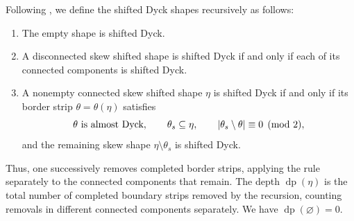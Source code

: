 \documentclass[12pt]{amsart}
\newcommand{\defi}[1]{{\upshape\sffamily #1}}
\theoremstyle{definition}
\numberwithin{equation}{section}
\begin{document}
Following \cite[Section 3]{brenti},
we define the \defi{shifted Dyck shapes} recursively as follows:
\begin{enumerate}
\item The empty shape is shifted Dyck.
\item A disconnected skew shifted shape is shifted Dyck if and only if
each of its connected components is shifted Dyck.
\item A nonempty connected skew shifted shape $\eta$ is shifted Dyck
if and only if its border strip $\theta=\theta(\eta)$ satisfies
\begin{equation}\label{eq:sh-dyck-recursion}
 \theta\textnormal{ is almost Dyck},\qquad
 \theta_s\subseteq\eta,\qquad
 |\theta_s\setminus\theta|\equiv0\pmod2,
\end{equation}
and the remaining skew shape $\eta\setminus\theta_s$ is shifted Dyck.
\end{enumerate}
Thus, one successively removes completed border strips,
applying the rule separately to the connected components that remain. The \defi{depth} $\operatorname{dp}(\eta)$ is the total number
of completed boundary strips removed by the recursion, counting
removals in different connected components separately.
We have $\operatorname{dp}(\varnothing)=0$.
\end{document}

